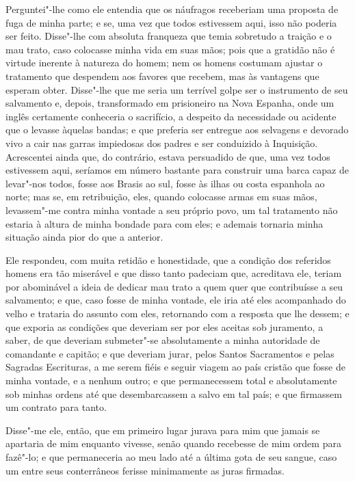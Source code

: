 Perguntei"-lhe como ele entendia que os náufragos receberiam uma proposta
de fuga de minha parte; e se, uma vez que todos estivessem aqui, isso
não poderia ser feito. Disse"-lhe com absoluta franqueza que temia
sobretudo a traição e o mau trato, caso colocasse minha vida em suas
mãos; pois que a gratidão não é virtude inerente à natureza do homem;
nem os homens costumam ajustar o tratamento que despendem aos favores
que recebem, mas às vantagens que esperam obter. Disse"-lhe que me seria
um terrível golpe ser o instrumento de seu salvamento e, depois,
transformado em prisioneiro na Nova Espanha, onde um inglês certamente
conheceria o sacrifício, a despeito da necessidade ou acidente que o
levasse àquelas bandas; e que preferia ser entregue aos selvagens e
devorado vivo a cair nas garras impiedosas dos padres e ser conduizido à
Inquisição. Acrescentei ainda que, do contrário, estava persuadido de
que, uma vez todos estivessem aqui, seríamos em número bastante para
construir uma barca capaz de levar"-nos todos, fosse aos Brasis ao sul,
fosse às ilhas ou costa espanhola ao norte; mas se, em retribuição,
eles, quando colocasse armas em suas mãos, levassem"-me contra minha
vontade a seu próprio povo, um tal tratamento não estaria à altura de
minha bondade para com eles; e ademais tornaria minha situação ainda
pior do que a anterior.

Ele respondeu, com muita retidão e honestidade, que a condição dos
referidos homens era tão miserável e que disso tanto padeciam que,
acreditava ele, teriam por abominável a ideia de dedicar mau trato a
quem quer que contribuísse a seu salvamento; e que, caso fosse de minha
vontade, ele iria até eles acompanhado do velho e trataria do assunto
com eles, retornando com a resposta que lhe dessem; e que exporia as
condições que deveriam ser por eles aceitas sob juramento, a saber, de
que deveriam submeter"-se absolutamente a minha autoridade de comandante
e capitão; e que deveriam jurar, pelos Santos Sacramentos e pelas
Sagradas Escrituras, a me serem fiéis e seguir viagem ao país cristão
que fosse de minha vontade, e a nenhum outro; e que permanecessem total
e absolutamente sob minhas ordens até que desembarcassem a salvo em tal
país; e que firmassem um contrato para tanto.

Disse"-me ele, então, que em primeiro lugar jurava para mim que jamais se
apartaria de mim enquanto vivesse, senão quando recebesse de mim ordem
para fazê"-lo; e que permaneceria ao meu lado até a última gota de seu
sangue, caso um entre seus conterrâneos ferisse minimamente as juras
firmadas.


